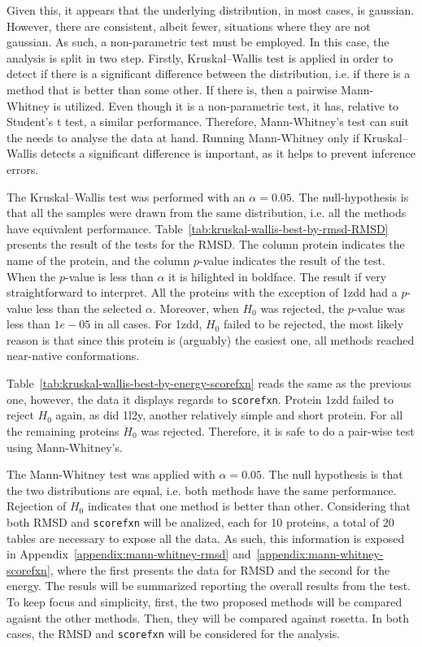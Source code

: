 Given this, it appears that the underlying distribution, in most cases, is
gaussian. However, there are consistent, albeit fewer, situations where they are
not gaussian. As such, a non-parametric test must be employed. In this case, the
analysis is split in two step. Firstly, Kruskal–Wallis test is applied in order
to detect if there is a significant difference between the distribution, i.e.
if there is a method that is better than some other. If there is, then
a pairwise Mann-Whitney is utilized. Even though it is a non-parametric test, it
has, relative to Student's t test, a similar performance. Therefore,
Mann-Whitney's test can suit the needs to analyse the data at hand. Running
Mann-Whitney only if Kruskal–Wallis detects a significant difference is
important, as it helps to prevent inference errors.

The Kruskal–Wallis test was performed with an $\alpha = 0.05$. The null-hypothesis
is that all the samples were drawn from the same distribution, i.e. all the
methods have equivalent performance.
Table~\ref{tab:kruskal-wallis-best-by-rmsd-RMSD} presents the result of the
tests for the RMSD.
The column protein indicates the name of the protein, and the column
$p$-value indicates the result of the test. When the $p$-value is less than
$\alpha$ it is hilighted in boldface. The result if very straightforward to
interpret. All the proteins with the exception of 1zdd had a $p$-value less
than the selected $\alpha$. Moreover, when $H_0$ was rejected, the $p$-value
was less than $1e-05$ in all cases. For 1zdd, $H_0$ failed to be rejected, the
most likely reason is that since this protein is (arguably) the easiest one,
all methods reached near-native conformations.

Table~\ref{tab:kruskal-wallis-best-by-energy-scorefxn} reads the same
as the previous one, however, the data it displays regards to \texttt{scorefxn}.
Protein 1zdd failed to reject $H_0$ again, as did 1l2y, another relatively
simple and short protein. For all the remaining proteins $H_0$ was rejected.
Therefore, it is safe to do a pair-wise test using Mann-Whitney's.



The Mann-Whitney test was applied with $\alpha = 0.05$. The null hypothesis is
that the two distributions are equal, i.e. both methods have the same
performance. Rejection of $H_0$ indicates that one method is better than other.
Considering that both RMSD and \texttt{scorefxn} will be analized, each for
10 proteins, a total of $20$ tables are necessary to expose all the data. As
such, this information is exposed in Appendix~\ref{appendix:mann-whitney-rmsd}
and~\ref{appendix:mann-whitney-scorefxn}, where the first presents the data for
RMSD and the second for the energy. The resuls will be summarized reporting the
overall results from the test. To keep focus and simplicity, first, the two
proposed methods will be compared agaisnt the other methods. Then, they will be
compared against rosetta. In both cases, the RMSD and \texttt{scorefxn} will be
considered for the analysis.

